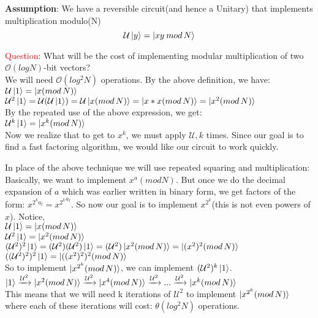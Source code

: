 \documentclass[11.5pt, paper=a4]{article}
\theoremstyle{definition}
\numberwithin{theorem}{section}
\begin{document}
\noindent \textbf{Assumption}: We have a reversible circuit(and hence a Unitary) that implements multiplication modulo(N)
\begin{equation}
    \mathcal{U} \ket{y} = \ket{xy\:{mod\,N}}
\end{equation}

\textcolor{red}{Question}: What will be the cost of implementing modular multiplication of two $\mathcal{O}(log N)$-bit vectors?\\
We will need $\mathcal{O}(log^2N)$ operations.
By the above definition, we have:\\
$\mathcal{U} \ket{1}= \ket{x (mod\,N)}$\\ 
$\mathcal{U}^2 \ket{1}= \mathcal{U}(\mathcal{U} \ket{1}) = \mathcal{U} \ket{x (mod\,N)} = \ket{x*x (mod\,N)} = \ket{x^2 (mod\,N)}$\\
By the repeated use of the above expression, we get:\\
$\mathcal{U}^k \ket{1}= \ket{x^k (mod\,N)}$\\

Now we realize that to get to $x^k$, we must apply $\mathcal{U}, k$ times. Since our goal is to find a fast factoring algorithm, we would like our circuit to work quickly.

In place of the above technique we will use repeated squaring and multiplication: Basically, we want to implement $x^a (mod N)$. But once we do the decimal expansion of $a$ which was earlier written in binary form, we get factors of the form: $x^{2^k a_l} = {x^{2^k}}^{a_l}$. So now our goal is to implement $x^{2^k}$(this is not even powers of $x$). Notice,\\
$\mathcal{U} \ket{1}= \ket{x (mod\,N)}$\\
$\mathcal{U}^2 \ket{1} = \ket{x^2 (mod\,N)}$\\
$(\mathcal{U}^2)^2 \ket{1} = (\mathcal{U}^2)(\mathcal{U}^2) \ket{1}= (\mathcal{U}^2) \ket{x^2 (mod\,N)} = \ket{(x^2)^2 (mod\,N)}$\\
$((\mathcal{U}^2)^2)^2 \ket{1} = \ket{((x^2)^2)^2 (mod\,N)}$\\

So to implement $\ket{x^{2^k} (mod\,N)}$, we can implement $(\mathcal{U}^2)^k \ket{1}$.\\
$\ket{1} \xrightarrow{\mathcal{U}^2} \ket{x^2(mod\,N)} \xrightarrow{\mathcal{U}^2} \ket{x^4(mod\,N)} \xrightarrow{\mathcal{U}^2} ... \xrightarrow{\mathcal{U}^2} \ket{x^k(mod\,N)}$\\
This means that we will need k iterations of ${\mathcal{U}^2}$ to implement $\ket{x^{2^k} (mod\,N)}$ where each of these iterations will cost: $\theta(log^2 N)$ operations.
\end{document}

